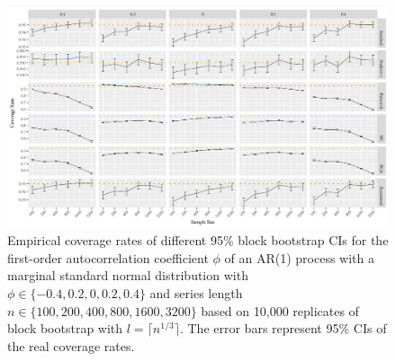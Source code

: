 \documentclass[10pt]{article}
\begin{document}
\begin{figure}[tbp]
  \centering
  \includegraphics[width=\textwidth]{figures/plot_norm_phi_1}
  \caption{Empirical coverage rates of different 95\% block bootstrap CIs for 
    the first-order autocorrelation coefficient $\phi$ of an AR(1) process with 
    a marginal standard normal distribution with 
    $\phi \in \{-0.4, 0.2, 0, 0.2, 0.4\}$ and series length
    $n \in \{100, 200, 400, 800, 1600, 3200\}$ based on 10,000 replicates of
    block bootstrap with $l = \lceil n^{1/3} \rceil$. The
    error bars represent 95\% CIs of the real coverage rates.}
  \label{fig:phi1}
\end{figure}
\end{document}
